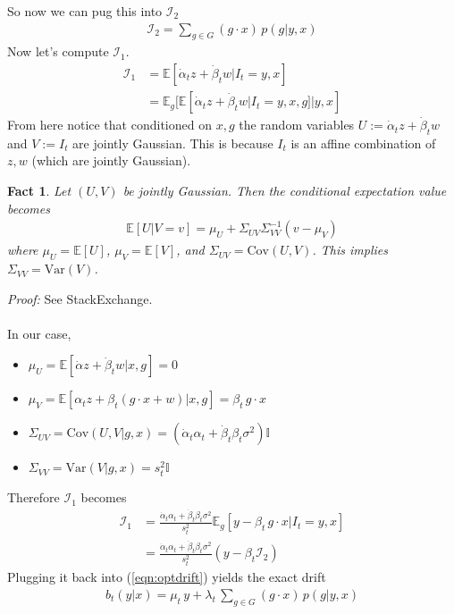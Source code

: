 \documentclass[12pt,fleqn]{article}
\numberwithin{equation}{section}
\newtheorem{fact}{Fact}
\begin{document}
So now we can pug this into $\mathcal I_2$
\begin{align}
	\mathcal I_2 = \sum_{g \in G} (g\cdot x)\, p(g|y,x)
\end{align}
Now let's compute $\mathcal I_1$.
\begin{align}
	\mathcal I_1 & = \mathbb E[\dot \alpha_t z + \dot \beta_t w | I_t = y , x]\\
	& = \mathbb E_g[\mathbb E[\dot \alpha_t z + \dot \beta_t w | I_t = y, x , g]|y,x]
\end{align}
From here notice that conditioned on $x,g$ the random variables $U :=\dot \alpha_t z + \dot \beta_t w$ and $V:=I_t$ are jointly Gaussian. This is because $I_t$ is an affine combination of $z,w$ (which are jointly Gaussian).
\begin{fact}
	Let $(U,V)$ be jointly Gaussian. Then the conditional expectation value becomes
	\begin{align}
		\mathbb E[U|V=v] = \mu_U + \Sigma_{UV} \Sigma^{-1}_{VV}(v - \mu_V)
	\end{align}
	where $\mu_U = \mathbb E[U]$, $\mu_V = \mathbb E[V]$, and $\Sigma_{UV} = \text{Cov}(U,V)$. This implies $\Sigma_{VV} = \text{Var}(V)$.
\end{fact}
\emph{Proof:} See StackExchange.
\\
\\
In our case,
\begin{itemize}
	\item $\mu_U = \mathbb E[\dot \alpha z + \dot \beta_t w| x,g]= 0$
	\item $\mu_V = \mathbb E[\alpha_t z + \beta_t(g\cdot x + w)| x,g] = \beta_t \, g\cdot x$
	\item $\Sigma_{UV} = \text{Cov}(U,V|g,x) = (\dot \alpha_t \alpha_t+ \dot \beta_t \beta_t \sigma^2) \mathbb I$
	\item $\Sigma_{VV} = \text{Var}(V |g,x) = s_t^2 \mathbb I$
\end{itemize}
Therefore $\mathcal I_1$ becomes
\begin{align}
	\mathcal I_1 & = \frac{\dot \alpha_t \alpha_t +\dot \beta_t \beta_t \sigma^2}{s_t^2} \mathbb E_g \left[ y - \beta_t \, g\cdot x  | I_t=y,x\right]\\
	& = \frac{\dot \alpha_t \alpha_t +\dot \beta_t \beta_t \sigma^2}{s_t^2} (y - \beta_t \mathcal I_2)
\end{align}
Plugging it back into (\ref{eqn:optdrift}) yields the exact drift
\begin{align}
	\boxed{b_t(y|x) = \mu_t \, y+ \lambda_t \, \sum_{g \in G} (g\cdot x)\, p(g|y,x)} \label{eqn:optdrift_solution}
\end{align}
\end{document}
